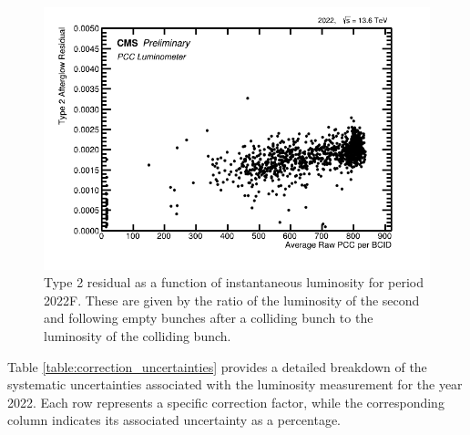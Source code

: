 \begin{itemize}
\begin{figure}[H]
\centering
\includegraphics[width=1\textwidth]{ashish_thesis/afterglow_t2res_vsinstlumi_1.png}
\caption[2022 PCC Type 2 Afterglow Residuals]{%
  Type 2 residual as a function of instantaneous luminosity for period 2022F. These are given by the ratio of the luminosity of the second and following empty bunches after a colliding bunch to the luminosity of the colliding bunch.
}
\label{fig:period_bound_45}
\end{figure}

\end{itemize}

\newpage
Table \ref{table:correction_uncertainties} provides a detailed breakdown of the systematic uncertainties associated with the luminosity measurement for the year 2022. Each row represents a specific correction factor, while the corresponding column indicates its associated uncertainty as a percentage. 

